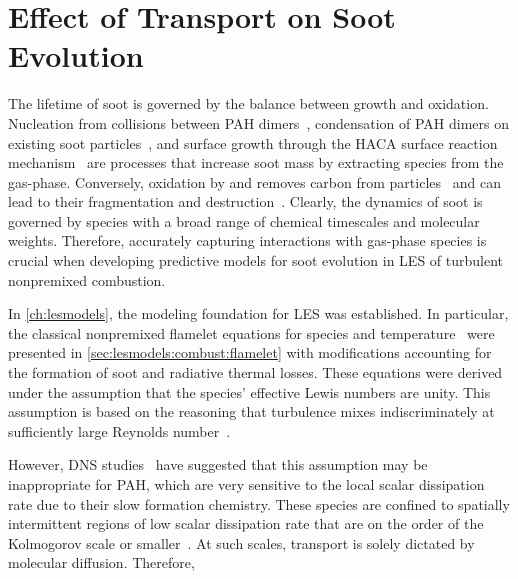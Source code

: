 \chapter{Effect of Transport on Soot Evolution\label{ch:transport}}

The lifetime of soot is governed by the balance between growth and oxidation. Nucleation from collisions between PAH dimers~\cite{blanquart2009,schuetz2002,frenklach1991,wang2011}, condensation of PAH dimers on existing soot particles~\cite{blanquart2009,hmom2009}, and surface growth through the HACA surface reaction mechanism~\cite{frenklach1985,frenklach1991} are processes that increase soot mass by extracting species from the gas-phase. Conversely, oxidation by  and  removes carbon from particles~\cite{stanmore2001,neoh1981,kazakov1995} and can lead to their fragmentation and destruction~\cite{neoh1984,mueller2011}. Clearly, the dynamics of soot is governed by species with a broad range of chemical timescales and molecular weights. Therefore, accurately capturing interactions with gas-phase species is crucial when developing predictive models for soot evolution in LES of turbulent nonpremixed combustion.

In \cref{ch:lesmodels}, the modeling foundation for LES was established. In particular, the classical nonpremixed flamelet equations for species and temperature~\cite{peters1984} were presented in \cref{sec:lesmodels:combust:flamelet} with modifications accounting for the formation of soot and radiative thermal losses. These equations were derived under the assumption that the species' effective Lewis numbers are unity. This assumption is based on the reasoning that turbulence mixes indiscriminately at sufficiently large Reynolds number~\cite{pitsch19981057}.


However, DNS studies~\cite{bisetti2012,attili2014} have suggested that this assumption may be inappropriate for PAH, which are very sensitive to the local scalar dissipation rate due to their slow formation chemistry. These species are confined to spatially intermittent regions of low scalar dissipation rate that are on the order of the Kolmogorov scale or smaller~\cite{vaishnavi2008}. At such scales, transport is solely dictated by molecular diffusion. Therefore, 

